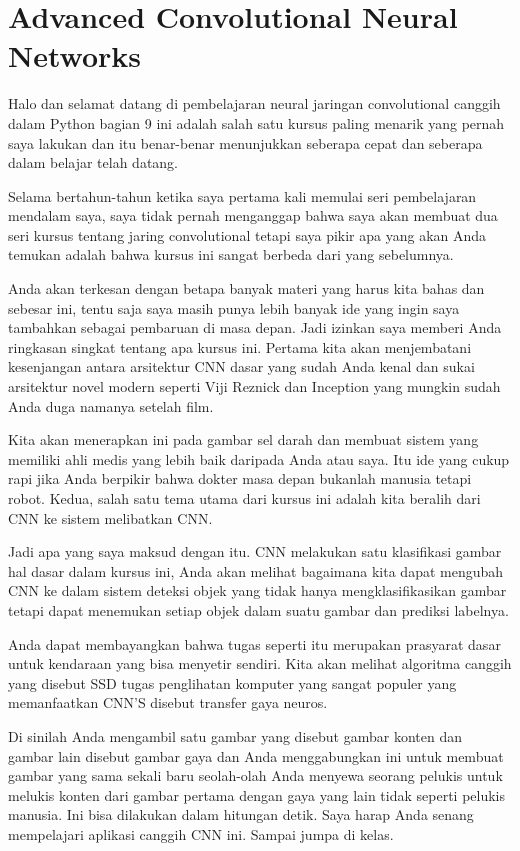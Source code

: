 \chapter{Advanced Convolutional Neural Networks} 

Halo dan selamat datang di pembelajaran neural jaringan convolutional canggih dalam Python bagian 9
ini adalah salah satu kursus paling menarik yang pernah saya lakukan dan itu benar-benar menunjukkan seberapa cepat dan seberapa dalam belajar
telah datang.

Selama bertahun-tahun ketika saya pertama kali memulai seri pembelajaran mendalam saya, saya tidak pernah menganggap bahwa saya akan membuat dua seri
kursus tentang jaring convolutional tetapi saya pikir apa yang akan Anda temukan adalah bahwa kursus ini sangat berbeda
dari yang sebelumnya.

Anda akan terkesan dengan betapa banyak materi yang harus kita bahas dan sebesar ini, tentu saja saya masih
punya lebih banyak ide yang ingin saya tambahkan sebagai pembaruan di masa depan.
Jadi izinkan saya memberi Anda ringkasan singkat tentang apa kursus ini.
Pertama kita akan menjembatani kesenjangan antara arsitektur CNN dasar yang sudah Anda kenal dan sukai
arsitektur novel modern seperti Viji Reznick dan Inception yang mungkin sudah Anda duga namanya
setelah film.

Kita akan menerapkan ini pada gambar sel darah dan membuat sistem yang memiliki ahli medis yang lebih baik
daripada Anda atau saya.
Itu ide yang cukup rapi jika Anda berpikir bahwa dokter masa depan bukanlah manusia tetapi robot.
Kedua, salah satu tema utama dari kursus ini adalah kita beralih dari CNN ke sistem
melibatkan CNN.

Jadi apa yang saya maksud dengan itu.
CNN melakukan satu klasifikasi gambar hal dasar dalam kursus ini, Anda akan melihat bagaimana kita dapat mengubah CNN
ke dalam sistem deteksi objek yang tidak hanya mengklasifikasikan gambar tetapi dapat menemukan setiap objek dalam suatu gambar
dan prediksi labelnya.

Anda dapat membayangkan bahwa tugas seperti itu merupakan prasyarat dasar untuk kendaraan yang bisa menyetir sendiri.
Kita akan melihat algoritma canggih yang disebut SSD tugas penglihatan komputer yang sangat populer
yang memanfaatkan CNN'S disebut transfer gaya neuros.

Di sinilah Anda mengambil satu gambar yang disebut gambar konten dan gambar lain disebut gambar gaya
dan Anda menggabungkan ini untuk membuat gambar yang sama sekali baru seolah-olah Anda menyewa seorang pelukis untuk melukis konten
dari gambar pertama dengan gaya yang lain tidak seperti pelukis manusia.
Ini bisa dilakukan dalam hitungan detik.
Saya harap Anda senang mempelajari aplikasi canggih CNN ini.
Sampai jumpa di kelas.


